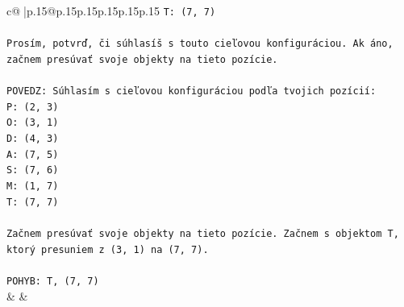 \documentclass{article}
\begin{document}
{\begin{supertabular}{c@{$\;$}|p{.15\linewidth}@{}p{.15\linewidth}p{.15\linewidth}p{.15\linewidth}p{.15\linewidth}p{.15\linewidth}}
{{{\texttt{T: (7, 7)} \\
\\ 
\texttt{Prosím, potvrď, či súhlasíš s touto cieľovou konfiguráciou. Ak áno, začnem presúvať svoje objekty na tieto pozície.} \\
\\ 
\texttt{POVEDZ: Súhlasím s cieľovou konfiguráciou podľa tvojich pozícií:} \\
\texttt{P: (2, 3)} \\
\texttt{O: (3, 1)} \\
\texttt{D: (4, 3)} \\
\texttt{A: (7, 5)} \\
\texttt{S: (7, 6)} \\
\texttt{M: (1, 7)} \\
\texttt{T: (7, 7)} \\
\\ 
\texttt{Začnem presúvať svoje objekty na tieto pozície. Začnem s objektom T, ktorý presuniem z (3, 1) na (7, 7).} \\
\\ 
\texttt{POHYB: T, (7, 7)} \\
            }
        }
    }
    & & \\ \\


\end{supertabular}}
\end{document}
